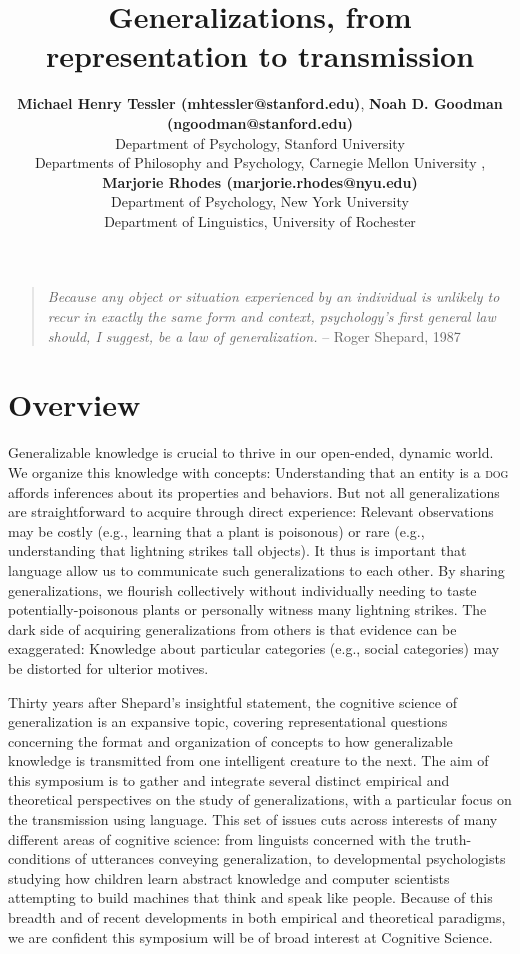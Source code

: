 \documentclass[10pt,letterpaper]{article}
\title{Generalizations, from representation to transmission}
\author{{\large \bf Michael Henry Tessler (mhtessler@stanford.edu)}, {\large \bf Noah D. Goodman (ngoodman@stanford.edu)}  \\
  Department of Psychology, Stanford University \vspace{-0.1cm}
   \AND {\large \bf David Danks (ddanks@cmu.edu)} \\
  Departments of Philosophy and Psychology, Carnegie Mellon University \vspace{-0.1cm}
    \AND{\large \bf Emily Foster-Hanson (emily.fosterhanson@nyu.edu)}, {\large \bf Marjorie Rhodes (marjorie.rhodes@nyu.edu)} \\
  Department of Psychology, New York University \vspace{-0.1cm}
    \AND {\large \bf Gregory Carlson (calrson@ling.rochester.edu)} \\
  Department of Linguistics, University of Rochester \vspace{-0.1cm}
  }
\begin{document}
\maketitle



\begin{quote}
\footnotesize
\emph{Because any object or situation experienced by an individual is unlikely to recur in exactly the same form and context, psychology's first general law should, I suggest, be a law of generalization.}  -- Roger Shepard, 1987
\end{quote}
\section{Overview}

Generalizable knowledge is crucial to thrive in our open-ended, dynamic world. 
We organize this knowledge with concepts: Understanding that an entity is a \textsc{dog} affords inferences about its properties and behaviors. 
But not all generalizations are straightforward to acquire through direct experience: Relevant observations may be costly (e.g., learning that a plant is poisonous) or rare (e.g., understanding that lightning strikes tall objects). 
It thus is important that language allow us to communicate such generalizations to each other. 
By sharing generalizations, we flourish collectively without individually needing to taste potentially-poisonous plants or personally witness many lightning strikes.
The dark side of acquiring generalizations from others is that evidence can be exaggerated: Knowledge about particular categories (e.g., social categories) may be distorted for ulterior motives. 

Thirty years after Shepard's insightful statement, the cognitive science of generalization is an expansive topic, covering representational questions concerning the format and organization of concepts to how generalizable knowledge is transmitted from one intelligent creature to the next.
The aim of this symposium is to gather and integrate several distinct empirical and theoretical perspectives on the study of generalizations, with a particular focus on the transmission using language.
This set of issues cuts across interests of many different areas of cognitive science: from linguists concerned with the truth-conditions of utterances conveying generalization, to developmental psychologists studying how children learn abstract knowledge and computer scientists attempting to build machines that think and speak like people. 
Because of this breadth and of recent developments in both empirical and theoretical paradigms, we are confident this symposium will be of broad interest at Cognitive Science.
\end{document}
